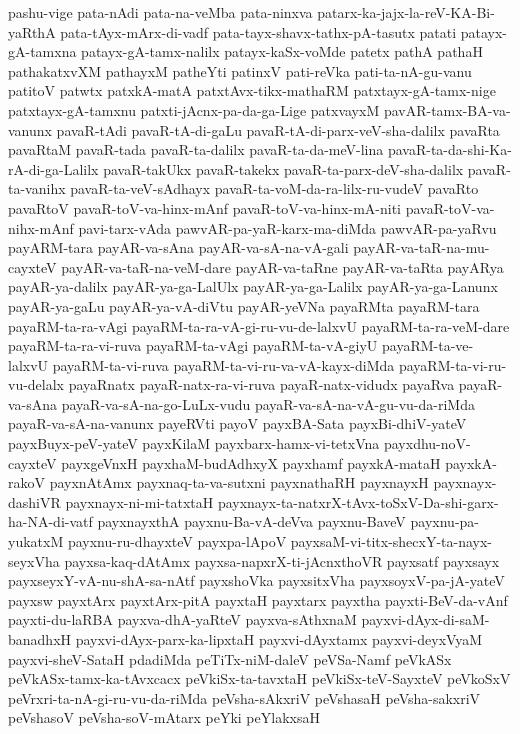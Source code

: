 {pashu-vige
pata-nAdi
pata-na-veMba
pata-ninxva
patarx-ka-jajx-la-reV-KA-Bi-yaRthA
pata-tAyx-mArx-di-vadf
pata-tayx-shavx-tathx-pA-tasutx
patati
patayx-gA-tamxna
patayx-gA-tamx-nalilx
patayx-kaSx-voMde
patetx
pathA
pathaH
pathakatxvXM
pathayxM
patheYti
patinxV
pati-reVka
pati-ta-nA-gu-vanu
patitoV
patwtx
patxkA-matA
patxtAvx-tikx-mathaRM
patxtayx-gA-tamx-nige
patxtayx-gA-tamxnu
patxti-jAcnx-pa-da-ga-Lige
patxvayxM
pavAR-tamx-BA-va-vanunx
pavaR-tAdi
pavaR-tA-di-gaLu
pavaR-tA-di-parx-veV-sha-dalilx
pavaRta
pavaRtaM
pavaR-tada
pavaR-ta-dalilx
pavaR-ta-da-meV-lina
pavaR-ta-da-shi-Ka-rA-di-ga-Lalilx
pavaR-takUkx
pavaR-takekx
pavaR-ta-parx-deV-sha-dalilx
pavaR-ta-vanihx
pavaR-ta-veV-sAdhayx
pavaR-ta-voM-da-ra-lilx-ru-vudeV
pavaRto
pavaRtoV
pavaR-toV-va-hinx-mAnf
pavaR-toV-va-hinx-mA-niti
pavaR-toV-va-nihx-mAnf
pavi-tarx-vAda
pawvAR-pa-yaR-karx-ma-diMda
pawvAR-pa-yaRvu
payARM-tara
payAR-va-sAna
payAR-va-sA-na-vA-gali
payAR-va-taR-na-mu-cayxteV
payAR-va-taR-na-veM-dare
payAR-va-taRne
payAR-va-taRta
payARya
payAR-ya-dalilx
payAR-ya-ga-LalUlx
payAR-ya-ga-Lalilx
payAR-ya-ga-Lanunx
payAR-ya-gaLu
payAR-ya-vA-diVtu
payAR-yeVNa
payaRMta
payaRM-tara
payaRM-ta-ra-vAgi
payaRM-ta-ra-vA-gi-ru-vu-de-lalxvU
payaRM-ta-ra-veM-dare
payaRM-ta-ra-vi-ruva
payaRM-ta-vAgi
payaRM-ta-vA-giyU
payaRM-ta-ve-lalxvU
payaRM-ta-vi-ruva
payaRM-ta-vi-ru-va-vA-kayx-diMda
payaRM-ta-vi-ru-vu-delalx
payaRnatx
payaR-natx-ra-vi-ruva
payaR-natx-vidudx
payaRva
payaR-va-sAna
payaR-va-sA-na-go-LuLx-vudu
payaR-va-sA-na-vA-gu-vu-da-riMda
payaR-va-sA-na-vanunx
payeRVti
payoV
payxBA-Sata
payxBi-dhiV-yateV
payxBuyx-peV-yateV
payxKilaM
payxbarx-hamx-vi-tetxVna
payxdhu-noV-cayxteV
payxgeVnxH
payxhaM-budAdhxyX
payxhamf
payxkA-mataH
payxkA-rakoV
payxnAtAmx
payxnaq-ta-va-sutxni
payxnathaRH
payxnayxH
payxnayx-dashiVR
payxnayx-ni-mi-tatxtaH
payxnayx-ta-natxrX-tAvx-toSxV-Da-shi-garx-ha-NA-di-vatf
payxnayxthA
payxnu-Ba-vA-deVva
payxnu-BaveV
payxnu-pa-yukatxM
payxnu-ru-dhayxteV
payxpa-lApoV
payxsaM-vi-titx-shecxY-ta-nayx-seyxVha
payxsa-kaq-dAtAmx
payxsa-napxrX-ti-jAcnxthoVR
payxsatf
payxsayx
payxseyxY-vA-nu-shA-sa-nAtf
payxshoVka
payxsitxVha
payxsoyxV-pa-jA-yateV
payxsw
payxtArx
payxtArx-pitA
payxtaH
payxtarx
payxtha
payxti-BeV-da-vAnf
payxti-du-laRBA
payxva-dhA-yaRteV
payxva-sAthxnaM
payxvi-dAyx-di-saM-banadhxH
payxvi-dAyx-parx-ka-lipxtaH
payxvi-dAyxtamx
payxvi-deyxVyaM
payxvi-sheV-SataH
pdadiMda
peTiTx-niM-daleV
peVSa-Namf
peVkASx
peVkASx-tamx-ka-tAvxcacx
peVkiSx-ta-tavxtaH
peVkiSx-teV-SayxteV
peVkoSxV
peVrxri-ta-nA-gi-ru-vu-da-riMda
peVsha-sAkxriV
peVshasaH
peVsha-sakxriV
peVshasoV
peVsha-soV-mAtarx
peYki
peYlakxsaH
}
